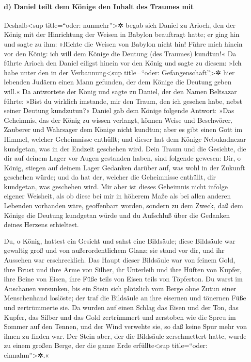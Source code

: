 \hypertarget{d-daniel-teilt-dem-kuxf6nige-den-inhalt-des-traumes-mit}{%
\paragraph{d) Daniel teilt dem Könige den Inhalt des Traumes
mit}\label{d-daniel-teilt-dem-kuxf6nige-den-inhalt-des-traumes-mit}}

Deshalb\textless sup title=``oder: nunmehr''\textgreater✲
begab sich Daniel zu Arioch, den der König mit der Hinrichtung der
Weisen in Babylon beauftragt hatte; er ging hin und sagte zu ihm:
»Richte die Weisen von Babylon nicht hin! Führe mich hinein vor den
König: ich will dem Könige die Deutung (des Traumes) kundtun!«
Da führte Arioch den Daniel eiligst hinein vor den König
und sagte zu diesem: »Ich habe unter den in der Verbannung\textless sup
title=``oder: Gefangenschaft''\textgreater✲ hier lebenden Judäern einen
Mann gefunden, der dem Könige die Deutung geben will.« Da
antwortete der König und sagte zu Daniel, der den Namen Beltsazar
führte: »Bist du wirklich imstande, mir den Traum, den ich gesehen habe,
nebst seiner Deutung kundzutun?« Daniel gab dem Könige
folgende Antwort: »Das Geheimnis, das der König zu wissen verlangt,
können Weise und Beschwörer, Zauberer und Wahrsager dem Könige nicht
kundtun; aber es gibt einen Gott im Himmel, welcher
Geheimnisse enthüllt; und dieser hat dem Könige Nebukadnezar kundgetan,
was in der Endzeit geschehen wird. Dein Traum und die Gesichte, die dir
auf deinem Lager vor Augen gestanden haben, sind folgende gewesen:
Dir, o König, stiegen auf deinem Lager Gedanken darüber
auf, was wohl in der Zukunft geschehen würde; und da hat der, welcher
die Geheimnisse enthüllt, dir kundgetan, was geschehen wird.
Mir aber ist dieses Geheimnis nicht infolge eigener
Weisheit, als ob diese bei mir in höherem Maße als bei allen anderen
Lebenden vorhanden wäre, geoffenbart worden, sondern zu dem Zweck, daß
dem Könige die Deutung kundgetan würde und du Aufschluß über die
Gedanken deines Herzens erhieltest.

Du, o König, hattest ein Gesicht und sahst eine
Bildsäule; diese Bildsäule war gewaltig groß und von außerordentlichem
Glanz; sie stand vor dir, und ihr Aussehen war erschrecklich.
Das Haupt dieser Bildsäule war von feinem Gold, ihre
Brust und ihre Arme von Silber, ihr Unterleib und ihre Hüften von
Kupfer, ihre Beine von Eisen, ihre Füße teils von Eisen
teils von Töpferton. Du warst im Anschauen versunken, bis
ein Stein sich plötzlich vom Berge ohne Zutun einer Menschenhand
loslöste; der traf die Bildsäule an ihre eisernen und tönernen Füße und
zertrümmerte sie. Da wurden auf einen Schlag das Eisen
und der Ton, das Kupfer, das Silber und das Gold zertrümmert und
zerstoben wie die Spreu im Sommer auf den Tennen, und der Wind verwehte
sie, so daß keine Spur mehr von ihnen zu finden war. Der Stein aber, der
die Bildsäule zerschmettert hatte, wurde zu einem großen Berge, der die
ganze Erde erfüllte\textless sup title=``oder: einnahm''\textgreater✲.«

